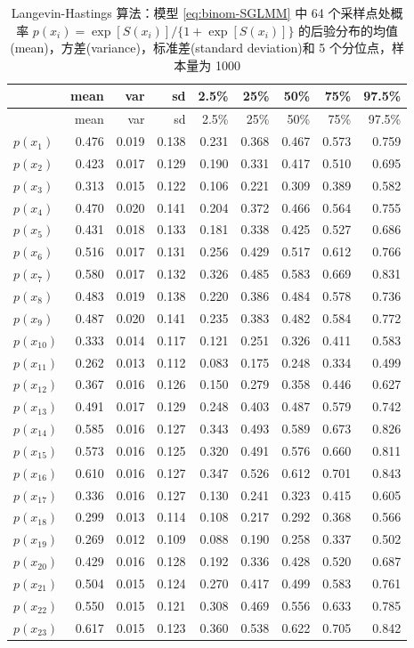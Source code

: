 \documentclass[12pt,a4paper,UTF8,twoside]{book}
\theoremstyle{definition}
\theoremstyle{definition}
\theoremstyle{definition}
\theoremstyle{remark}
\begin{document}
\begin{longtable}[]{@{}lrrrrrrrr@{}}
\caption{\label{tab:LH-binom-SGLMM} Langevin-Hastings 算法：模型 \eqref{eq:binom-SGLMM} 中 64 个采样点处概率 \(p(x_i) = \exp[S(x_i)]/\{1 + \exp[S(x_i)]\}\) 的后验分布的均值(mean)，方差(variance)，标准差(standard deviation)和 5 个分位点，样本量为 1000}\tabularnewline
\toprule
& mean & var & sd & 2.5\% & 25\% & 50\% & 75\% & 97.5\%\tabularnewline
\midrule
\endfirsthead
\toprule
& mean & var & sd & 2.5\% & 25\% & 50\% & 75\% & 97.5\%\tabularnewline
\midrule
\endhead
\(p(x_{1})\) & 0.476 & 0.019 & 0.138 & 0.231 & 0.368 & 0.467 & 0.573 & 0.759\tabularnewline
\(p(x_{2})\) & 0.423 & 0.017 & 0.129 & 0.190 & 0.331 & 0.417 & 0.510 & 0.695\tabularnewline
\(p(x_{3})\) & 0.313 & 0.015 & 0.122 & 0.106 & 0.221 & 0.309 & 0.389 & 0.582\tabularnewline
\(p(x_{4})\) & 0.470 & 0.020 & 0.141 & 0.204 & 0.372 & 0.466 & 0.564 & 0.755\tabularnewline
\(p(x_{5})\) & 0.431 & 0.018 & 0.133 & 0.181 & 0.338 & 0.425 & 0.527 & 0.686\tabularnewline
\(p(x_{6})\) & 0.516 & 0.017 & 0.131 & 0.256 & 0.429 & 0.517 & 0.612 & 0.766\tabularnewline
\(p(x_{7})\) & 0.580 & 0.017 & 0.132 & 0.326 & 0.485 & 0.583 & 0.669 & 0.831\tabularnewline
\(p(x_{8})\) & 0.483 & 0.019 & 0.138 & 0.220 & 0.386 & 0.484 & 0.578 & 0.736\tabularnewline
\(p(x_{9})\) & 0.487 & 0.020 & 0.141 & 0.235 & 0.383 & 0.482 & 0.584 & 0.772\tabularnewline
\(p(x_{10})\) & 0.333 & 0.014 & 0.117 & 0.121 & 0.251 & 0.326 & 0.411 & 0.583\tabularnewline
\(p(x_{11})\) & 0.262 & 0.013 & 0.112 & 0.083 & 0.175 & 0.248 & 0.334 & 0.499\tabularnewline
\(p(x_{12})\) & 0.367 & 0.016 & 0.126 & 0.150 & 0.279 & 0.358 & 0.446 & 0.627\tabularnewline
\(p(x_{13})\) & 0.491 & 0.017 & 0.129 & 0.248 & 0.403 & 0.487 & 0.579 & 0.742\tabularnewline
\(p(x_{14})\) & 0.585 & 0.016 & 0.127 & 0.343 & 0.493 & 0.589 & 0.673 & 0.826\tabularnewline
\(p(x_{15})\) & 0.573 & 0.016 & 0.125 & 0.320 & 0.491 & 0.576 & 0.660 & 0.811\tabularnewline
\(p(x_{16})\) & 0.610 & 0.016 & 0.127 & 0.347 & 0.526 & 0.612 & 0.701 & 0.843\tabularnewline
\(p(x_{17})\) & 0.336 & 0.016 & 0.127 & 0.130 & 0.241 & 0.323 & 0.415 & 0.605\tabularnewline
\(p(x_{18})\) & 0.299 & 0.013 & 0.114 & 0.108 & 0.217 & 0.292 & 0.368 & 0.566\tabularnewline
\(p(x_{19})\) & 0.269 & 0.012 & 0.109 & 0.088 & 0.190 & 0.258 & 0.337 & 0.502\tabularnewline
\(p(x_{20})\) & 0.429 & 0.016 & 0.128 & 0.192 & 0.336 & 0.428 & 0.520 & 0.687\tabularnewline
\(p(x_{21})\) & 0.504 & 0.015 & 0.124 & 0.270 & 0.417 & 0.499 & 0.583 & 0.761\tabularnewline
\(p(x_{22})\) & 0.550 & 0.015 & 0.121 & 0.308 & 0.469 & 0.556 & 0.633 & 0.785\tabularnewline
\(p(x_{23})\) & 0.617 & 0.015 & 0.123 & 0.360 & 0.538 & 0.622 & 0.705 & 0.842\tabularnewline

\end{longtable}
\end{document}
